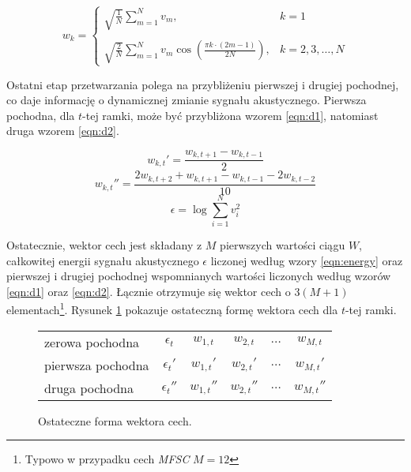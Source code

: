 \documentclass[shortabstract, mgr]{iithesis}
\begin{document}
	 \begin{equation}
		w_k = 
		\begin{cases}
			\sqrt{\frac{1}{N}}\sum_{m=1}^{N}v_m, & k = 1 \\
			&\\
			\sqrt{\frac{2}{N}}\sum_{m=1}^{N}{v_m \cos(\frac{\pi k \cdot (2m - 1)}{2N})}, & k = 2,3,\ldots,N
		\end{cases}
		\label{eqn:DCT}
	 \end{equation}
	 
	 Ostatni etap przetwarzania polega na przybliżeniu pierwszej i drugiej pochodnej, co daje informację o dynamicznej zmianie sygnału akustycznego. Pierwsza pochodna, dla $t$-tej ramki, może być przybliżona wzorem \ref{eqn:d1}, natomiast druga wzorem \ref{eqn:d2}.
	 
	 \begin{equation}
	 	 w_{k,t}'=\frac{w_{k,t+1}-w_{k,t-1}}{2}
	 	 \label{eqn:d1}
	 \end{equation}
	 \begin{equation}
		 w_{k,t}''=\frac{2w_{k,t+2}+w_{k,t+1}-w_{k,t-1}-2w_{k,t-2}}{10}
		 \label{eqn:d2}
	 \end{equation}
	 \begin{equation}
	 	\epsilon = \log \sum_{i=1}^N {v_i^2}
	 	\label{eqn:energy}
	 \end{equation}
	 
	 Ostatecznie, wektor cech jest składany z $M$ pierwszych wartości ciągu $W$, całkowitej energii sygnału akustycznego $\epsilon$ liczonej według wzory \ref{eqn:energy} oraz pierwszej i drugiej pochodnej wspomnianych wartości liczonych według wzorów \ref{eqn:d1} oraz \ref{eqn:d2}. Łącznie otrzymuje się wektor cech o $3(M+1)$ elementach\footnote{Typowo w przypadku cech \textit{MFSC} $M=12$}. Rysunek \ref{fig:feature_vector} pokazuje ostateczną formę wektora cech dla $t$-tej ramki.
	 
	\begin{figure}[H]
		\begin{center}
			\begin{tabular}{l|ccccc}
				zerowa pochodna   & $\epsilon_t$   & $w_{1,t}$   & $w_{2,t}$   & $\ldots$ & $w_{M,t}$   \\
				pierwsza pochodna & $\epsilon_t'$  & $w_{1,t}'$  & $w_{2,t}'$  & $\ldots$ & $w_{M,t}'$  \\
				druga pochodna    & $\epsilon_t''$ & $w_{1,t}''$ & $w_{2,t}''$ & $\ldots$ & $w_{M,t}''$ \\
			\end{tabular}
			\label{fig:feature_vector}
			\caption{Ostateczne forma wektora cech.}
		\end{center}
	\end{figure}
\end{document}
